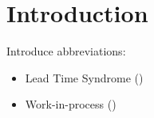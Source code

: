 \documentclass[mnsc]{informs3}
\begin{document}
\maketitle

%


\section{Introduction}
\label{sec:introduction}

Introduce abbreviations:
\begin{itemize}
\item Lead Time Syndrome (\LTS{})
\item Work-in-process (\WIP{})\\
\end{itemize}
\end{document}
